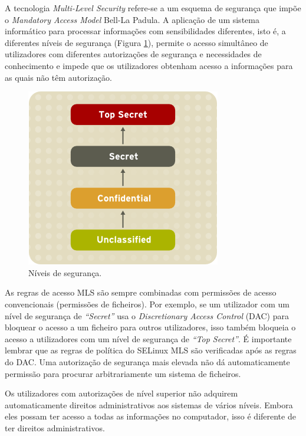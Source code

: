 \documentclass[../tp2.tex]{subfiles}
\begin{document}
A tecnologia \textit{Multi-Level Security} refere-se a um esquema de segurança que impõe o \textit{Mandatory Access Model} Bell-La Padula. A aplicação de um sistema informático para processar informações com sensibilidades diferentes, isto é, a diferentes níveis de segurança (Figura \ref{fig:niveis}), permite o acesso simultâneo de utilizadores com diferentes autorizações de segurança e necessidades de conhecimento e impede que os utilizadores obtenham acesso a informações para as quais não têm autorização.\par

\begin{figure}[H]
\centering
\captionsetup{justification=centering,margin=2cm}
\centerline{\includegraphics[scale=0.45]{../imagens/niveis.png}}
\caption{Níveis de segurança.}
\label{fig:niveis}
\end{figure}

As regras de acesso MLS são sempre combinadas com permissões de acesso convencionais (permissões de ficheiros). Por exemplo, se um utilizador com um nível de segurança de \textit{``Secret''} usa o \textit{Discretionary Access Control} (DAC) para bloquear o acesso a um ficheiro para outros utilizadores, isso também bloqueia o acesso a utilizadores com um nível de segurança de \textit{``Top Secret''}. É importante lembrar que as regras de política do SELinux MLS são verificadas após as regras do DAC. Uma autorização de segurança mais elevada não dá automaticamente permissão para procurar arbitrariamente um sistema de ficheiros.\par

Os utilizadores com autorizações de nível superior não adquirem automaticamente direitos administrativos aos sistemas de vários níveis. Embora eles possam ter acesso a todas as informações no computador, isso é diferente de ter direitos administrativos.\par 
\end{document}
